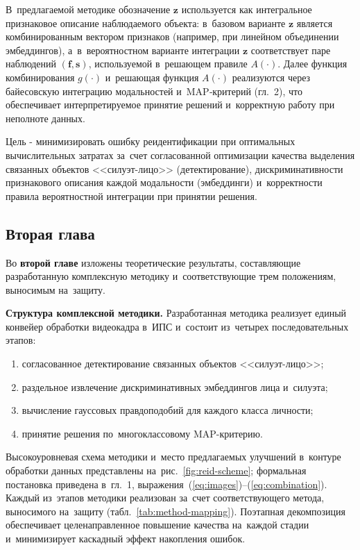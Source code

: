 В~предлагаемой методике обозначение $\mathbf{z}$ используется как интегральное
признаковое описание наблюдаемого объекта: в~базовом варианте $\mathbf{z}$ является
комбинированным вектором признаков (например, при линейном объединении эмбеддингов),
а~в~вероятностном варианте интеграции $\mathbf{z}$ соответствует паре наблюдений
$(\mathbf{f},\mathbf{s})$, используемой в~решающем правиле $A(\cdot)$.
Далее функция комбинирования $g(\cdot)$ и~решающая функция $A(\cdot)$ реализуются
через байесовскую интеграцию модальностей и~MAP‑критерий (гл.~2), что обеспечивает
интерпретируемое принятие решений и~корректную работу при неполноте данных.

Цель - минимизировать ошибку реидентификации при оптимальных вычислительных
затратах за~счет согласованной оптимизации качества выделения связанных
объектов <<силуэт-лицо>> (детектирование), дискриминативности признакового
описания каждой модальности (эмбеддинги) и~корректности правила
вероятностной интеграции при принятии решения.

\subsection*{Вторая глава}

Во \textbf{второй главе} изложены теоретические результаты, составляющие
разработанную комплексную методику и~соответствующие трем положениям,
выносимым на~защиту.

\textbf{Структура комплексной методики.} Разработанная методика реализует
единый конвейер обработки видеокадра в~ИПС и~состоит из~четырех
последовательных этапов:
\begin{enumerate}
    \item согласованное детектирование связанных объектов <<силуэт-лицо>>;
    \item раздельное извлечение дискриминативных эмбеддингов лица
          и~силуэта;
    \item вычисление гауссовых правдоподобий для каждого класса
          личности;
    \item принятие решения по~многоклассовому MAP-критерию.
\end{enumerate}
Высокоуровневая схема методики и~место предлагаемых улучшений в~контуре
обработки данных представлены на~рис.~\ref{fig:reid-scheme}; формальная
постановка приведена в~гл.~1, выражения~(\ref{eq:images})--(\ref{eq:combination}).
Каждый из~этапов методики реализован за~счет соответствующего метода,
выносимого на~защиту (табл.~\ref{tab:method-mapping}). Поэтапная
декомпозиция обеспечивает целенаправленное повышение качества
на~каждой стадии и~минимизирует каскадный эффект накопления ошибок.

